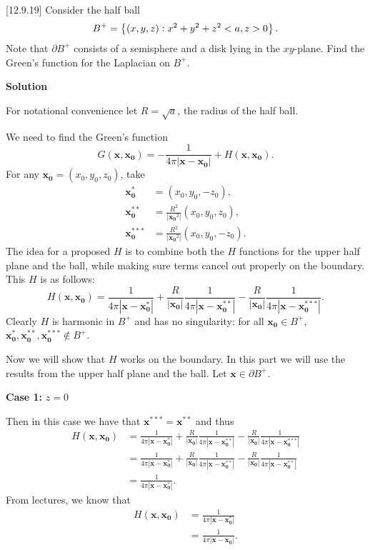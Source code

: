 \documentclass{article}
\def\*#1{\mathbf{#1}}
\begin{document}
[12.9.19] Consider the half ball
%
\begin{equation*}
    B^+ = \cbr[1]{(x, y, z): x^2 + y^2 + z^2 < a, z > 0}
    .
\end{equation*}
%
Note that $\partial B^+$ consists of a semisphere and a disk lying in
the $x y$-plane. Find the Green's function for the Laplacian on $B^+$.

\textbf{Solution}

For notational convenience let $R = \sqrt{a}$, the radius of the half
ball.

We need to find the Green's function
%
\begin{equation*}
    G(\*x, \*{x_0}) = - \frac{1}{4 \pi |\*x - \*{x_0}|} + H(\*x, \*{x_0})
    .
\end{equation*}
%
For any $\*{x_0} = (x_0, y_0, z_0)$, take
%
\begin{align*}
    \*{x_0^{*}} &= (x_0, y_0, -z_0), \\
    \*{x_0^{**}} &= \frac{R^2}{|\*{x_0}^2|} (x_0, y_0, z_0), \\
    \*{x_0^{***}} &= \frac{R^2}{|\*{x_0}^2|} (x_0, y_0, -z_0)
    .
\end{align*}
%
The idea for a proposed $H$ is to combine both the $H$ functions for the
upper half plane and the ball, while making sure terms cancel out
properly on the boundary. This $H$ is as follows:
%
\begin{equation*}
    H(\*{x}, \*{x_0}) =
        \frac{1}{4 \pi |\*x - \*{x_0^*}|}
        + \frac{R}{|\*{x_0}|} \frac{1}{4 \pi |\*x - \*{x_0^{**}}|}
        - \frac{R}{|\*{x_0}|} \frac{1}{4 \pi |\*x - \*{x_0^{***}}|}
    .
\end{equation*}
%
Clearly $H$ is harmonic in $B^+$ and has no singularity: for all
$\*{x_0} \in B^+$, $\*{x_0^*}, \*{x_0^{**}}, \*{x_0^{***}} \notin B^+$.

Now we will show that $H$ works on the boundary. In this part we will
use the results from the upper half plane and the ball. Let $\*x \in
\partial B^+$.

\textbf{Case 1:} $z = 0$

Then in this case we have that $\*{x^{***}} = \*{x^{**}}$ and thus
%
\begin{align*}
    H(\*{x}, \*{x_0}) &=
        \frac{1}{4 \pi |\*x - \*{x_0^*}|}
        + \frac{R}{|\*{x_0}|} \frac{1}{4 \pi |\*x - \*{x_0^{**}}|}
        - \frac{R}{|\*{x_0}|} \frac{1}{4 \pi |\*x - \*{x_0^{***}}|} \\
    &=
        \frac{1}{4 \pi |\*x - \*{x_0^*}|}
        + \frac{R}{|\*{x_0}|} \frac{1}{4 \pi |\*x - \*{x_0^{**}}|}
        - \frac{R}{|\*{x_0}|} \frac{1}{4 \pi |\*x - \*{x_0^{**}}|} \\
    &=
        \frac{1}{4 \pi |\*x - \*{x_0^*}|}
    .
\end{align*}
%
From lectures, we know that
%
\begin{align*}
    H(\*{x}, \*{x_0})
        &= \frac{1}{4 \pi |\*x - \*{x_0^*}|} \\
        &= \frac{1}{4 \pi |\*x - \*{x_0}|}
    .
\end{align*}
\end{document}
